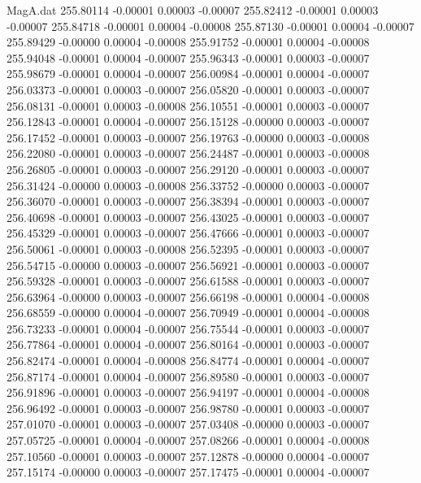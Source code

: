\begin{filecontents}{MagA.dat}
 255.80114   -0.00001    0.00003   -0.00007
 255.82412   -0.00001    0.00003   -0.00007
 255.84718   -0.00001    0.00004   -0.00008
 255.87130   -0.00001    0.00004   -0.00007
 255.89429   -0.00000    0.00004   -0.00008
 255.91752   -0.00001    0.00004   -0.00008
 255.94048   -0.00001    0.00004   -0.00007
 255.96343   -0.00001    0.00003   -0.00007
 255.98679   -0.00001    0.00004   -0.00007
 256.00984   -0.00001    0.00004   -0.00007
 256.03373   -0.00001    0.00003   -0.00007
 256.05820   -0.00001    0.00003   -0.00007
 256.08131   -0.00001    0.00003   -0.00008
 256.10551   -0.00001    0.00003   -0.00007
 256.12843   -0.00001    0.00004   -0.00007
 256.15128   -0.00000    0.00003   -0.00007
 256.17452   -0.00001    0.00003   -0.00007
 256.19763   -0.00000    0.00003   -0.00008
 256.22080   -0.00001    0.00003   -0.00007
 256.24487   -0.00001    0.00003   -0.00008
 256.26805   -0.00001    0.00003   -0.00007
 256.29120   -0.00001    0.00003   -0.00007
 256.31424   -0.00000    0.00003   -0.00008
 256.33752   -0.00000    0.00003   -0.00007
 256.36070   -0.00001    0.00003   -0.00007
 256.38394   -0.00001    0.00003   -0.00007
 256.40698   -0.00001    0.00003   -0.00007
 256.43025   -0.00001    0.00003   -0.00007
 256.45329   -0.00001    0.00003   -0.00007
 256.47666   -0.00001    0.00003   -0.00007
 256.50061   -0.00001    0.00003   -0.00008
 256.52395   -0.00001    0.00003   -0.00007
 256.54715   -0.00000    0.00003   -0.00007
 256.56921   -0.00001    0.00003   -0.00007
 256.59328   -0.00001    0.00003   -0.00007
 256.61588   -0.00001    0.00003   -0.00007
 256.63964   -0.00000    0.00003   -0.00007
 256.66198   -0.00001    0.00004   -0.00008
 256.68559   -0.00000    0.00004   -0.00007
 256.70949   -0.00001    0.00004   -0.00008
 256.73233   -0.00001    0.00004   -0.00007
 256.75544   -0.00001    0.00003   -0.00007
 256.77864   -0.00001    0.00004   -0.00007
 256.80164   -0.00001    0.00003   -0.00007
 256.82474   -0.00001    0.00004   -0.00008
 256.84774   -0.00001    0.00004   -0.00007
 256.87174   -0.00001    0.00004   -0.00007
 256.89580   -0.00001    0.00003   -0.00007
 256.91896   -0.00001    0.00003   -0.00007
 256.94197   -0.00001    0.00004   -0.00008
 256.96492   -0.00001    0.00003   -0.00007
 256.98780   -0.00001    0.00003   -0.00007
 257.01070   -0.00001    0.00003   -0.00007
 257.03408   -0.00000    0.00003   -0.00007
 257.05725   -0.00001    0.00004   -0.00007
 257.08266   -0.00001    0.00004   -0.00008
 257.10560   -0.00001    0.00003   -0.00007
 257.12878   -0.00000    0.00004   -0.00007
 257.15174   -0.00000    0.00003   -0.00007
 257.17475   -0.00001    0.00004   -0.00007

\end{filecontents}
